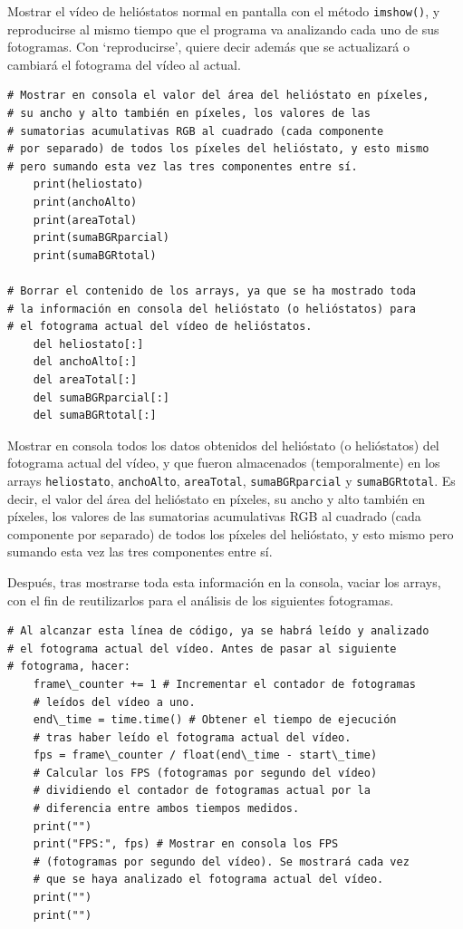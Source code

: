 Mostrar el vídeo de helióstatos normal en pantalla con el método \verb|imshow()|, y reproducirse al mismo tiempo que el programa va analizando cada uno de sus fotogramas. Con ‘reproducirse’, quiere decir además que se actualizará o cambiará el fotograma del vídeo al actual.\\[20pt]

\begin{lstlisting}
# Mostrar en consola el valor del área del helióstato en píxeles,
# su ancho y alto también en píxeles, los valores de las
# sumatorias acumulativas RGB al cuadrado (cada componente
# por separado) de todos los píxeles del helióstato, y esto mismo
# pero sumando esta vez las tres componentes entre sí.
    print(heliostato)
    print(anchoAlto)
    print(areaTotal)
    print(sumaBGRparcial)
    print(sumaBGRtotal)

# Borrar el contenido de los arrays, ya que se ha mostrado toda
# la información en consola del helióstato (o helióstatos) para
# el fotograma actual del vídeo de helióstatos.
    del heliostato[:]
    del anchoAlto[:]
    del areaTotal[:]
    del sumaBGRparcial[:]
    del sumaBGRtotal[:]
\end{lstlisting}
    
Mostrar en consola todos los datos obtenidos del helióstato (o helióstatos) del fotograma actual del vídeo, y que fueron almacenados (temporalmente) en los arrays \verb|heliostato|, \verb|anchoAlto|, \verb|areaTotal|, \verb|sumaBGRparcial| y \verb|sumaBGRtotal|. Es decir, el valor del área del helióstato en píxeles, su ancho y alto también en píxeles, los valores de las sumatorias acumulativas RGB al cuadrado (cada componente por separado) de todos los píxeles del helióstato, y esto mismo pero sumando esta vez las tres componentes entre sí.

Después, tras mostrarse toda esta información en la consola, vaciar los arrays, con el fin de reutilizarlos para el análisis de los siguientes fotogramas.\\[20pt]

\begin{lstlisting}
# Al alcanzar esta línea de código, ya se habrá leído y analizado
# el fotograma actual del vídeo. Antes de pasar al siguiente
# fotograma, hacer:
    frame\_counter += 1 # Incrementar el contador de fotogramas
    # leídos del vídeo a uno.
    end\_time = time.time() # Obtener el tiempo de ejecución
    # tras haber leído el fotograma actual del vídeo.
    fps = frame\_counter / float(end\_time - start\_time)
    # Calcular los FPS (fotogramas por segundo del vídeo)
    # dividiendo el contador de fotogramas actual por la
    # diferencia entre ambos tiempos medidos.
    print("")
    print("FPS:", fps) # Mostrar en consola los FPS
    # (fotogramas por segundo del vídeo). Se mostrará cada vez
    # que se haya analizado el fotograma actual del vídeo.
    print("")
    print("")
\end{lstlisting}

